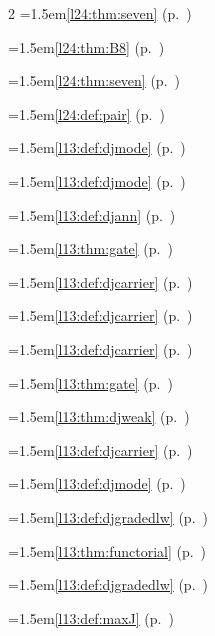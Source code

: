 \begin{multicols}{2}
\hangindent=1.5em\quad \ref{l24:thm:seven} (p.~\pageref{l24:thm:seven})\par
\hangindent=1.5em\quad \ref{l24:thm:B8} (p.~\pageref{l24:thm:B8})\par
\hangindent=1.5em\quad \ref{l24:thm:seven} (p.~\pageref{l24:thm:seven})\par
\hangindent=1.5em\quad \ref{l24:def:pair} (p.~\pageref{l24:def:pair})\par
\hangindent=1.5em\quad \ref{l13:def:djmode} (p.~\pageref{l13:def:djmode})\par
\hangindent=1.5em\quad \ref{l13:def:djmode} (p.~\pageref{l13:def:djmode})\par
\hangindent=1.5em\quad \ref{l13:def:djann} (p.~\pageref{l13:def:djann})\par
\hangindent=1.5em\quad \ref{l13:thm:gate} (p.~\pageref{l13:thm:gate})\par
\hangindent=1.5em\quad \ref{l13:def:djcarrier} (p.~\pageref{l13:def:djcarrier})\par
\hangindent=1.5em\quad \ref{l13:def:djcarrier} (p.~\pageref{l13:def:djcarrier})\par
\hangindent=1.5em\quad \ref{l13:def:djcarrier} (p.~\pageref{l13:def:djcarrier})\par
\hangindent=1.5em\quad \ref{l13:thm:gate} (p.~\pageref{l13:thm:gate})\par
\hangindent=1.5em\quad \ref{l13:thm:djweak} (p.~\pageref{l13:thm:djweak})\par
\hangindent=1.5em\quad \ref{l13:def:djcarrier} (p.~\pageref{l13:def:djcarrier})\par
\hangindent=1.5em\quad \ref{l13:def:djmode} (p.~\pageref{l13:def:djmode})\par
\hangindent=1.5em\quad \ref{l13:def:djgradedlw} (p.~\pageref{l13:def:djgradedlw})\par
\hangindent=1.5em\quad \ref{l13:thm:functorial} (p.~\pageref{l13:thm:functorial})\par
\hangindent=1.5em\quad \ref{l13:def:djgradedlw} (p.~\pageref{l13:def:djgradedlw})\par
\hangindent=1.5em\quad \ref{l13:def:maxJ} (p.~\pageref{l13:def:maxJ})\par

\end{multicols}
